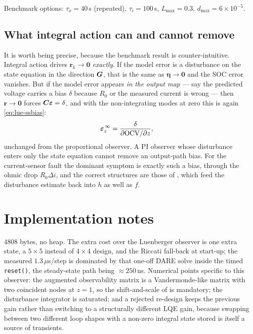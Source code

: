 Benchmark options: $\tau_x = 40$\,s (repeated), $\tau_i = 100$\,s, $L_{\max}=0.3$,
$d_{\max}=6\times10^{-5}$.

\subsection{What integral action can and cannot remove}
\label{sec:pi-limits}
It is worth being precise, because the benchmark result is counter-intuitive.  Integral action
drives $\bm{r}_k\to\bm{0}$ \emph{exactly}.  If the model error is a disturbance on the state
equation in the direction $\bm{G}$, that is the same as $\bm{\eta}\to\bm{0}$ and the SOC error
vanishes.  But if the model error appears \emph{in the output map} --- say the predicted voltage
carries a bias $\delta$ because $R_0$ or the measured current is wrong --- then $\bm{r}\to\bm{0}$
forces $\bm{C}\bm{\varepsilon} = \delta$, and with the non-integrating modes at zero this is again
\eqref{eq:lue-ssbias}:
\begin{equation}
\bm{\varepsilon}_{z}^{\,\infty} = \frac{\delta}{\partial\mathrm{OCV}/\partial z} ,
\label{eq:pi-ssbias}
\end{equation}
unchanged from the proportional observer.  A PI observer whose disturbance enters only the state
equation cannot remove an output-path bias.  For the current-sensor fault the dominant symptom
is exactly such a bias, through the ohmic drop $R_0\Delta i$, and the correct structures are
those of , which feed the disturbance estimate back into $h$ as well as $f$.

\section{Implementation notes}
$4808$ bytes, no heap.  The extra cost over the Luenberger observer is one extra state, a
$5\times5$ instead of $4\times4$ design, and the Riccati fall-back at start-up; the measured
$1.3\,\mu$s/step is dominated by that one-off DARE solve inside the timed \texttt{reset()}, the
steady-state path being $\approx 250$\,ns.  Numerical points specific to this observer: the
augmented observability matrix is a Vandermonde-like matrix with two coincident nodes at $z=1$,
so the shift-and-scale of  is mandatory; the disturbance integrator is
saturated; and a rejected re-design keeps the previous gain rather than switching to a
structurally different LQE gain, because swapping between two different loop shapes with a
non-zero integral state stored is itself a source of transients.

